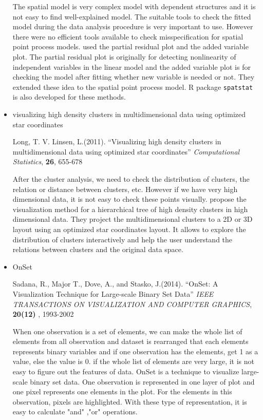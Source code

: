 \documentclass{article}
\begin{document}
\begin{itemize}
    The spatial model is very complex model with dependent structures and it is not easy to find well-explained model. The suitable tools to check the fitted model during the data analysis procedure is very important to use. However there were no efficient tools available to check misspecification for spatial point process models.  \citet{baddeley2013residual} used the partial residual plot and the added variable plot. The partial residual plot is originally for detecting nonlinearity of independent variables in the linear model and the added variable plot is for checking the model after fitting whether new variable is needed or not. They extended these idea to the spatial point process model.  R package {\tt spatstat} is also developed for these methods.


\item visualizing high density clusters in multidimensional data using optimized star coordinates

Long, T. V. Linsen, L.(2011).
``Visualizing high density clusters in multidimensional
data using optimized star coordinates''
{\em Computational Statistics}, {\bf 26}, 655-678

After the cluster analysis, we need to check the distribution of clusters, the relation or distance between clusters, etc. However if we have very high dimensional data, it is not easy to check these points visually. \citet{van2011visualizing} propose the visualization method for a hierarchical tree of high density clusters in high dimensional data. They project the multidimensional clusters to a 2D or 3D layout using an optimized star coordinates layout. It allows to explore the distribution of clusters interactively and help the user understand the relations between clusters and the original data space.

\item OnSet

Sadana, R., Major T., Dove, A., and Stasko, J.(2014).
``OnSet: A Visualization Technique for Large-scale Binary Set Data''
{\em IEEE TRANSACTIONS ON VISUALIZATION AND COMPUTER GRAPHICS}, {\bf 20(12)} , 1993-2002


When one observation is a set of elements, we can make the whole list of elements from all observation and dataset is rearranged that each elements represents binary variables and if one observation has the elements, get 1 as a value, else the value is 0. if the whole list of elements are very large, it is not easy to figure out the features of data.
OnSet\citep{sadana2014onset} is a technique to visualize large-scale binary set data. One observation is represented in one layer of plot and one pixel represents one elements in the plot. For the elements in this observation, pixels are highlighted. With these type of representation, it is easy to calculate "and" ,"or" operations.


\end{itemize}
\end{document}
